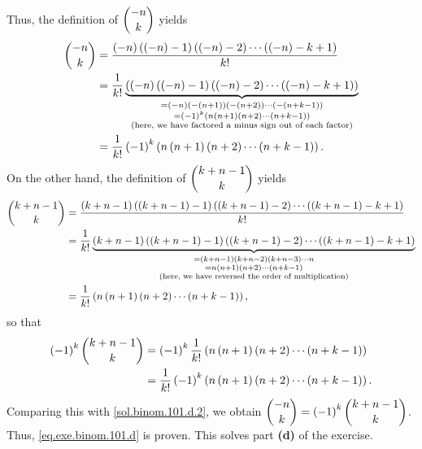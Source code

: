 \documentclass[paper=a4, fontsize=12pt]{scrartcl} %
\newcommand{\tup}[1]{\left( #1 \right)}
\newcommand{\underbrack}[2]{\underbrace{#1}_{\substack{#2}}}
\theoremstyle{plainsl}
\theoremstyle{definition}
\theoremstyle{remark}
\begin{document}
Thus, the definition of $\dbinom{-n}{k}$ yields
\begin{align}
   \dbinom{-n}{k}
&= \dfrac{ \tup{-n} \tup{\tup{-n}-1} \tup{\tup{-n}-2} \cdots \tup{\tup{-n}-k+1} }{k!} \nonumber\\
&= \dfrac{1}{k!}
    \underbrack{\tup{ \tup{-n} \tup{\tup{-n}-1} \tup{\tup{-n}-2} \cdots \tup{\tup{-n}-k+1} }}
               {= \tup{-n} \tup{-\tup{n+1}} \tup{-\tup{n+2}} \cdots \tup{-\tup{n+k-1}} \\
                = \tup{-1}^k \tup{ n \tup{n+1} \tup{n+2} \cdots \tup{n+k-1} } \\
                \text{(here, we have factored a minus sign out of each factor)}} \nonumber \\
&= \dfrac{1}{k!} \tup{-1}^k \tup{ n \tup{n+1} \tup{n+2} \cdots \tup{n+k-1} }.
\label{sol.binom.101.d.2}
\end{align}
On the other hand, the definition of $\dbinom{k + n - 1}{k}$ yields
\begin{align*}
   \dbinom{k + n - 1}{k}
&= \dfrac{ \tup{k+n-1} \tup{\tup{k+n-1}-1} \tup{\tup{k+n-1}-2} \cdots \tup{\tup{k+n-1}-k+1} }{k!} \\
&= \dfrac{1}{k!}
    \underbrack{ \tup{k+n-1} \tup{\tup{k+n-1}-1} \tup{\tup{k+n-1}-2} \cdots \tup{\tup{k+n-1}-k+1} }
               {= \tup{k+n-1} \tup{k+n-2} \tup{k+n-3} \cdots n \\
                = n \tup{n+1} \tup{n+2} \cdots \tup{n+k-1} \\
                \text{(here, we have reversed the order of multiplication)}} \\
&= \dfrac{1}{k!} \tup{ n \tup{n+1} \tup{n+2} \cdots \tup{n+k-1} } ,
\end{align*}
so that
\begin{align*}
   \tup{-1}^k \dbinom{k + n - 1}{k}
&= \tup{-1}^k \dfrac{1}{k!} \tup{ n \tup{n+1} \tup{n+2} \cdots \tup{n+k-1} } \\
&= \dfrac{1}{k!} \tup{-1}^k \tup{ n \tup{n+1} \tup{n+2} \cdots \tup{n+k-1} }.
\end{align*}
Comparing this with \eqref{sol.binom.101.d.2}, we obtain
$\dbinom{-n}{k} = \tup{-1}^k \dbinom{k + n - 1}{k}$.
Thus, \eqref{eq.exe.binom.101.d} is proven.
This solves part \textbf{(d)} of the exercise.

\vspace{0.8pc}
\end{document}

